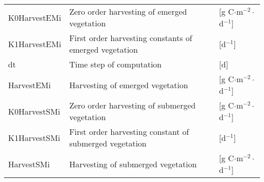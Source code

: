 \begin{tabular}{lll}
K0HarvestEMi    & Zero order harvesting of emerged vegetation             & [g C$\cdot$m$^{-2}\cdot$d$^{-1}$] \\
K1HarvestEMi    & First order harvesting constants of emerged vegetation  & [d$^{-1}$]                        \\
dt              & Time step of computation                                & [d]                               \\
HarvestEMi      & Harvesting of emerged vegetation                        & [g C$\cdot$m$^{-2}\cdot$d$^{-1}$] \\
K0HarvestSMi    & Zero order harvesting of submerged vegetation           & [g C$\cdot$m$^{-2}\cdot$d$^{-1}$] \\
K1HarvestSMi    & First order harvesting constant of submerged vegetation & [d$^{-1}$]                        \\
HarvestSMi      & Harvesting of submerged vegetation                      & [g C$\cdot$m$^{-2}\cdot$d$^{-1}$] \\
\end{tabular}
